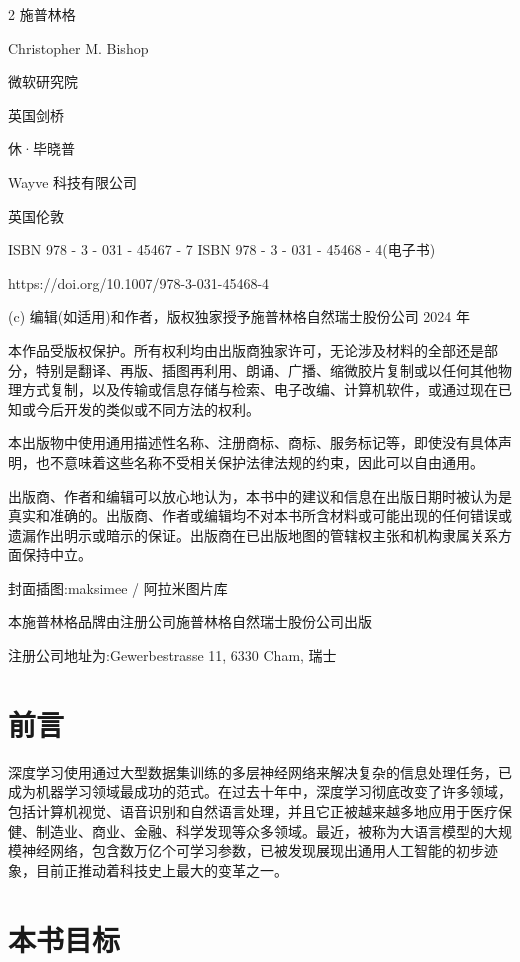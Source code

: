\documentclass[10pt]{article}
\newcommand{\customfootnote}[1]{
  \let\thefootnote\relax\footnotetext{#1}
}
\begin{document}
\customfootnote{

深度学习

}



2 施普林格

Christopher M. Bishop

微软研究院

英国剑桥

休·毕晓普

Wayve 科技有限公司

英国伦敦

ISBN 978 - 3 - 031 - 45467 - 7 ISBN 978 - 3 - 031 - 45468 - 4(电子书)

https://doi.org/10.1007/978-3-031-45468-4

(c) 编辑(如适用)和作者，版权独家授予施普林格自然瑞士股份公司 2024 年

本作品受版权保护。所有权利均由出版商独家许可，无论涉及材料的全部还是部分，特别是翻译、再版、插图再利用、朗诵、广播、缩微胶片复制或以任何其他物理方式复制，以及传输或信息存储与检索、电子改编、计算机软件，或通过现在已知或今后开发的类似或不同方法的权利。

本出版物中使用通用描述性名称、注册商标、商标、服务标记等，即使没有具体声明，也不意味着这些名称不受相关保护法律法规的约束，因此可以自由通用。

出版商、作者和编辑可以放心地认为，本书中的建议和信息在出版日期时被认为是真实和准确的。出版商、作者或编辑均不对本书所含材料或可能出现的任何错误或遗漏作出明示或暗示的保证。出版商在已出版地图的管辖权主张和机构隶属关系方面保持中立。

封面插图:maksimee / 阿拉米图片库

本施普林格品牌由注册公司施普林格自然瑞士股份公司出版

注册公司地址为:Gewerbestrasse 11, 6330 Cham, 瑞士

\section*{前言}

深度学习使用通过大型数据集训练的多层神经网络来解决复杂的信息处理任务，已成为机器学习领域最成功的范式。在过去十年中，深度学习彻底改变了许多领域，包括计算机视觉、语音识别和自然语言处理，并且它正被越来越多地应用于医疗保健、制造业、商业、金融、科学发现等众多领域。最近，被称为大语言模型的大规模神经网络，包含数万亿个可学习参数，已被发现展现出通用人工智能的初步迹象，目前正推动着科技史上最大的变革之一。

\section*{本书目标}
\end{document}
